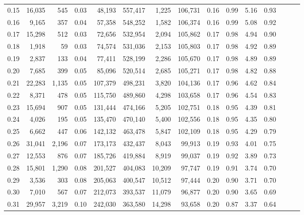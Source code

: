 \begin{tabular}{rrrrrrrrrrrrrrr}
0.15 &  16,035 &    545 &  0.03 &   48,193 &  557,417 &    1,225 &  106,731 &  0.16 &  0.99 &  5.16 &      0.93 \\
0.16 &   9,165 &    357 &  0.04 &   57,358 &  548,252 &    1,582 &  106,374 &  0.16 &  0.99 &  5.08 &      0.92 \\
0.17 &  15,298 &    512 &  0.03 &   72,656 &  532,954 &    2,094 &  105,862 &  0.17 &  0.98 &  4.94 &      0.90 \\
0.18 &   1,918 &     59 &  0.03 &   74,574 &  531,036 &    2,153 &  105,803 &  0.17 &  0.98 &  4.92 &      0.89 \\
0.19 &   2,837 &    133 &  0.04 &   77,411 &  528,199 &    2,286 &  105,670 &  0.17 &  0.98 &  4.89 &      0.89 \\
0.20 &   7,685 &    399 &  0.05 &   85,096 &  520,514 &    2,685 &  105,271 &  0.17 &  0.98 &  4.82 &      0.88 \\
0.21 &  22,283 &  1,135 &  0.05 &  107,379 &  498,231 &    3,820 &  104,136 &  0.17 &  0.96 &  4.62 &      0.84 \\
0.22 &   8,371 &    478 &  0.05 &  115,750 &  489,860 &    4,298 &  103,658 &  0.17 &  0.96 &  4.54 &      0.83 \\
0.23 &  15,694 &    907 &  0.05 &  131,444 &  474,166 &    5,205 &  102,751 &  0.18 &  0.95 &  4.39 &      0.81 \\
0.24 &   4,026 &    195 &  0.05 &  135,470 &  470,140 &    5,400 &  102,556 &  0.18 &  0.95 &  4.35 &      0.80 \\
0.25 &   6,662 &    447 &  0.06 &  142,132 &  463,478 &    5,847 &  102,109 &  0.18 &  0.95 &  4.29 &      0.79 \\
0.26 &  31,041 &  2,196 &  0.07 &  173,173 &  432,437 &    8,043 &   99,913 &  0.19 &  0.93 &  4.01 &      0.75 \\
0.27 &  12,553 &    876 &  0.07 &  185,726 &  419,884 &    8,919 &   99,037 &  0.19 &  0.92 &  3.89 &      0.73 \\
0.28 &  15,801 &  1,290 &  0.08 &  201,527 &  404,083 &   10,209 &   97,747 &  0.19 &  0.91 &  3.74 &      0.70 \\
0.29 &   3,536 &    303 &  0.08 &  205,063 &  400,547 &   10,512 &   97,444 &  0.20 &  0.90 &  3.71 &      0.70 \\
0.30 &   7,010 &    567 &  0.07 &  212,073 &  393,537 &   11,079 &   96,877 &  0.20 &  0.90 &  3.65 &      0.69 \\
0.31 &  29,957 &  3,219 &  0.10 &  242,030 &  363,580 &   14,298 &   93,658 &  0.20 &  0.87 &  3.37 &      0.64 \\

\end{tabular}

